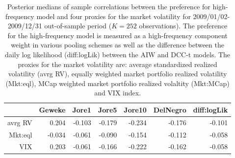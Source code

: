 \begin{table}[ht]
\centering
\caption{Posterior medians of sample correlations 
             between the preference for high-frequency
             model  and four proxies for the   market volatility for 
             2009/01/02-2009/12/31 out-of-sample period ($K=252$ observations).
             The preference for the high-frequency model is measured as a 
             high-frequency 
             component weight in various  pooling schemes 
             as well as the difference between the daily log likelihood (diff:logLik) 
             between the AIW and DCC-t models.
             The proxies for the market volatility are: average standardized 
             realized volatility (avrg RV), 
             equally weighted market portfolio realized volatility (Mkt:eql), 
             MCap weighted market portfolio realized volaltity (Mkt:MCap) 
             and VIX index.} 
\label{table:corrs_EX}
\begin{tabular}{rrrrrrr}
  \hline
 & Geweke & Jore1 & Jore5 & Jore10 & DelNegro & diff:logLik \\ 
  \hline
avrg RV & 0.204 & -0.103 & -0.179 & -0.234 & -0.176 & -0.101 \\ 
  Mkt:eql & -0.034 & -0.061 & -0.090 & -0.154 & -0.112 & -0.058 \\ 
  VIX & 0.203 & -0.061 & -0.166 & -0.222 & -0.162 & -0.058 \\ 
   \hline
\end{tabular}
\end{table}
